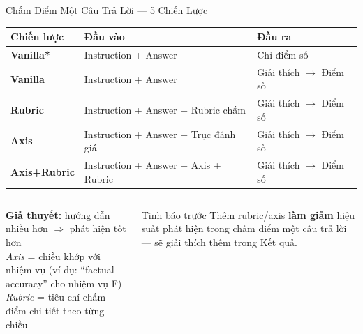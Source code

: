 \documentclass[aspectratio=169,10pt]{beamer}
\begin{document}
\begin{frame}{Chấm Điểm Một Câu Trả Lời — 5 Chiến Lược}
  \begin{center}
  \small
  \begin{tabular}{llp{7cm}}
    \toprule
    \textbf{Chiến lược} & \textbf{Đầu vào} & \textbf{Đầu ra} \\
    \midrule
    \textbf{Vanilla*}    & Instruction + Answer & Chỉ điểm số \\
    \textbf{Vanilla}     & Instruction + Answer & Giải thích $\to$ Điểm số \\
    \textbf{Rubric}      & Instruction + Answer + Rubric chấm & Giải thích $\to$ Điểm số \\
    \textbf{Axis}        & Instruction + Answer + Trục đánh giá & Giải thích $\to$ Điểm số \\
    \textbf{Axis+Rubric} & Instruction + Answer + Axis + Rubric & Giải thích $\to$ Điểm số \\
    \bottomrule
  \end{tabular}
  \end{center}

  \vspace{0.5em}
  \begin{columns}[T]
      \textbf{Giả thuyết:} hướng dẫn nhiều hơn $\Rightarrow$ phát hiện tốt hơn\\[0.3em]
      \textit{Axis} = chiều khớp với nhiệm vụ (ví dụ: ``factual accuracy'' cho nhiệm vụ F)\\
      \textit{Rubric} = tiêu chí chấm điểm chi tiết theo từng chiều
      \begin{alertblock}{Tinh báo trước}
        Thêm rubric/axis \textbf{làm giảm} hiệu suất phát hiện trong chấm điểm một câu trả lời — sẽ giải thích thêm trong Kết quả.
      \end{alertblock}
  \end{columns}
\end{frame}
\end{document}
